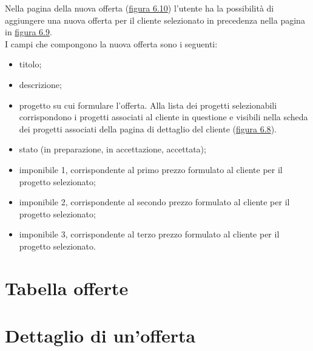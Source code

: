 \noindent Nella pagina della nuova offerta ({\hyperref[fig:nuovaOfferta]{figura 6.10}}) l'utente ha la possibilità di aggiungere una nuova offerta per il cliente selezionato in precedenza nella pagina in {\hyperref[fig:dettaglioCliente2]{figura 6.9}}. \\
I campi che compongono la nuova offerta sono i seguenti:
\begin{itemize}
\item titolo;
\item descrizione;
\item progetto su cui formulare l'offerta. Alla lista dei progetti selezionabili corrispondono i progetti associati al cliente in questione e visibili nella scheda dei progetti associati della pagina di dettaglio del cliente ({\hyperref[fig:dettaglioCliente1]{figura 6.8}}). 
\item stato (in preparazione, in accettazione, accettata);
\item imponibile 1, corrispondente al primo prezzo formulato al cliente per il progetto selezionato;
\item imponibile 2, corrispondente al secondo prezzo formulato al cliente per il progetto selezionato;
\item imponibile 3, corrispondente al terzo prezzo formulato al cliente per il progetto selezionato.
\end{itemize}

\pagebreak

\section{Tabella offerte}

\pagebreak

\section{Dettaglio di un'offerta}
